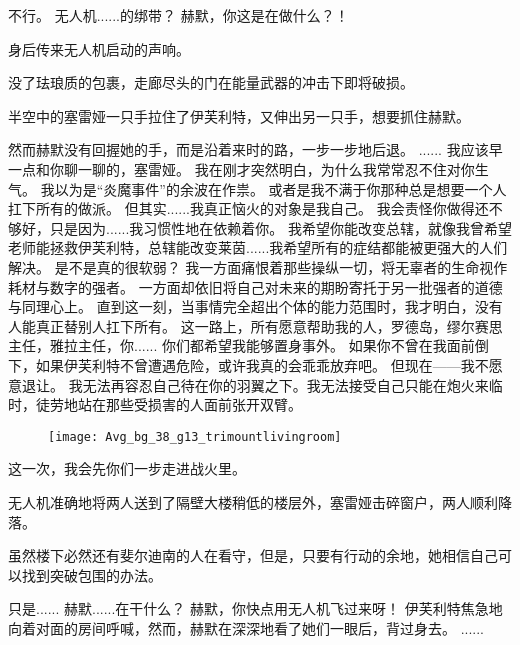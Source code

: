 \documentclass[openany]{book}
\begin{document}
\begin{dialogue}
     不行。
     无人机......的绑带？
     赫默，你这是在做什么？！\par
    身后传来无人机启动的声响。\par
    没了珐琅质的包裹，走廊尽头的门在能量武器的冲击下即将破损。\par
    半空中的塞雷娅一只手拉住了伊芙利特，又伸出另一只手，想要抓住赫默。\par
    然而赫默没有回握她的手，而是沿着来时的路，一步一步地后退。
     ......
     我应该早一点和你聊一聊的，塞雷娅。
     我在刚才突然明白，为什么我常常忍不住对你生气。
     我以为是“炎魔事件”的余波在作祟。
     或者是我不满于你那种总是想要一个人扛下所有的做派。
     但其实......我真正恼火的对象是我自己。
     我会责怪你做得还不够好，只是因为......我习惯性地在依赖着你。
     我希望你能改变总辖，就像我曾希望老师能拯救伊芙利特，总辖能改变莱茵......我希望所有的症结都能被更强大的人们解决。
     是不是真的很软弱？
     我一方面痛恨着那些操纵一切，将无辜者的生命视作耗材与数字的强者。
     一方面却依旧将自己对未来的期盼寄托于另一批强者的道德与同理心上。
     直到这一刻，当事情完全超出个体的能力范围时，我才明白，没有人能真正替别人扛下所有。
     这一路上，所有愿意帮助我的人，罗德岛，缪尔赛思主任，雅拉主任，你......
     你们都希望我能够置身事外。
     如果你不曾在我面前倒下，如果伊芙利特不曾遭遇危险，或许我真的会乖乖放弃吧。
     但现在——我不愿意退让。
     我无法再容忍自己待在你的羽翼之下。我无法接受自己只能在炮火来临时，徒劳地站在那些受损害的人面前张开双臂。
    \begin{figure}[h]
        \centering
        \texttt{[image: Avg\_bg\_38\_g13\_trimountlivingroom]}
    \end{figure}
     这一次，我会先你们一步走进战火里。\par
    无人机准确地将两人送到了隔壁大楼稍低的楼层外，塞雷娅击碎窗户，两人顺利降落。\par
    虽然楼下必然还有斐尔迪南的人在看守，但是，只要有行动的余地，她相信自己可以找到突破包围的办法。\par
    只是......
     赫默......在干什么？
     赫默，你快点用无人机飞过来呀！
    伊芙利特焦急地向着对面的房间呼喊，然而，赫默在深深地看了她们一眼后，背过身去。
     ......
\end{dialogue}\par
\end{document}
